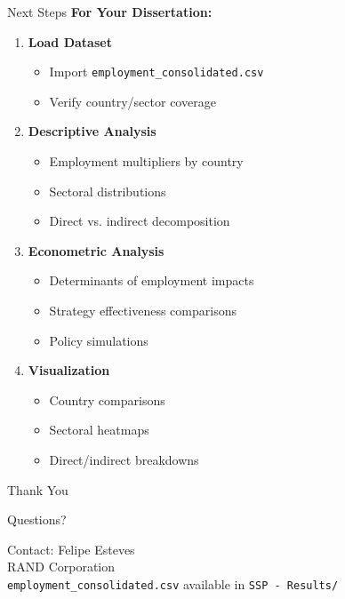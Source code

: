 \documentclass[10pt]{beamer}
\begin{document}
\begin{frame}{Next Steps}
\textbf{For Your Dissertation:}

\vspace{0.3cm}

\begin{enumerate}
    \item \textbf{Load Dataset}
    \begin{itemize}
        \item Import \texttt{employment\_consolidated.csv}
        \item Verify country/sector coverage
    \end{itemize}

    \vspace{0.2cm}

    \item \textbf{Descriptive Analysis}
    \begin{itemize}
        \item Employment multipliers by country
        \item Sectoral distributions
        \item Direct vs. indirect decomposition
    \end{itemize}

    \vspace{0.2cm}

    \item \textbf{Econometric Analysis}
    \begin{itemize}
        \item Determinants of employment impacts
        \item Strategy effectiveness comparisons
        \item Policy simulations
    \end{itemize}

    \vspace{0.2cm}

    \item \textbf{Visualization}
    \begin{itemize}
        \item Country comparisons
        \item Sectoral heatmaps
        \item Direct/indirect breakdowns
    \end{itemize}
\end{enumerate}
\end{frame}

\begin{frame}[plain]
\centering
\vspace{2cm}
{\Huge Thank You}

\vspace{1cm}

{\Large Questions?}

\vspace{2cm}

\small
Contact: Felipe Esteves \\
RAND Corporation \\
\texttt{employment\_consolidated.csv} available in \texttt{SSP - Results/}
\end{frame}
\end{document}
